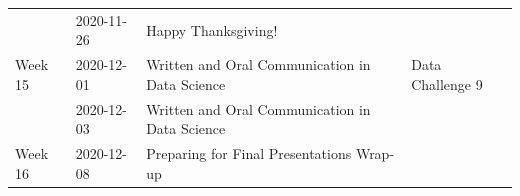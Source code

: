 \documentclass[
]{book}
\begin{document}
\begin{longtable}[]{@{}llll@{}}
\begin{minipage}[t]{0.22\columnwidth}
\strut
\end{minipage} & \begin{minipage}[t]{0.22\columnwidth}\raggedright
2020-11-26\strut
\end{minipage} & \begin{minipage}[t]{0.22\columnwidth}\raggedright
Happy Thanksgiving! 🌽🦃🏡\strut
\end{minipage} & \begin{minipage}[t]{0.22\columnwidth}\raggedright
\strut
\end{minipage}\tabularnewline
\begin{minipage}[t]{0.22\columnwidth}\raggedright
Week 15\strut
\end{minipage} & \begin{minipage}[t]{0.22\columnwidth}\raggedright
2020-12-01\strut
\end{minipage} & \begin{minipage}[t]{0.22\columnwidth}\raggedright
Written and Oral Communication in Data Science\strut
\end{minipage} & \begin{minipage}[t]{0.22\columnwidth}\raggedright
Data Challenge 9\strut
\end{minipage}\tabularnewline
\begin{minipage}[t]{0.22\columnwidth}\raggedright
\strut
\end{minipage} & \begin{minipage}[t]{0.22\columnwidth}\raggedright
2020-12-03\strut
\end{minipage} & \begin{minipage}[t]{0.22\columnwidth}\raggedright
Written and Oral Communication in Data Science\strut
\end{minipage} & \begin{minipage}[t]{0.22\columnwidth}\raggedright
\strut
\end{minipage}\tabularnewline
\begin{minipage}[t]{0.22\columnwidth}\raggedright
Week 16\strut
\end{minipage} & \begin{minipage}[t]{0.22\columnwidth}\raggedright
2020-12-08\strut
\end{minipage} & \begin{minipage}[t]{0.22\columnwidth}\raggedright
Preparing for Final Presentations Wrap-up\strut
\end{minipage} & \begin{minipage}[t]{0.22\columnwidth}\raggedright
\strut
\end{minipage}\tabularnewline
\bottomrule
\end{longtable}
\end{document}
